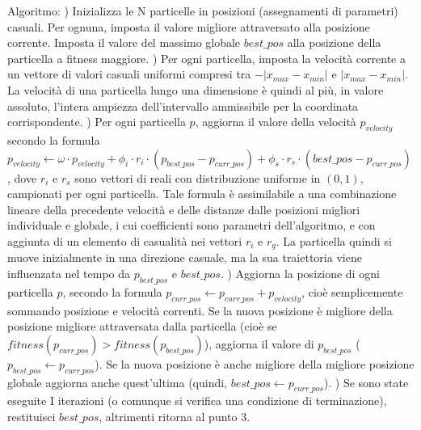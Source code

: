 \documentclass[12pt]{article}
\begin{document}
\newline
Algoritmo: \newline
\tab {}) Inizializza le N particelle in posizioni (assegnamenti di parametri) casuali. Per ognuna, imposta il valore migliore attraversato alla posizione corrente. Imposta il valore del massimo globale $best\_pos$ alla posizione della particella a fitness maggiore. \newline
\tab {}) Per ogni particella, imposta la velocità corrente a un vettore di valori casuali uniformi compresi tra $-|x_{max} - x_{min}|$ e $|x_{max} - x_{min}|$. La velocità di una particella lungo una dimensione è quindi al più, in valore assoluto, l'intera ampiezza dell'intervallo ammissibile per la coordinata corrispondente. \newline
\tab {}) Per ogni particella $p$, aggiorna il valore della velocità $p_{velocity}$ secondo la formula \newline $p_{velocity}  \leftarrow \omega \cdot p_{velocity} + \phi_i \cdot r_i \cdot \left( p_{best\_pos} - p_{curr\_pos} \right) + \phi_s \cdot r_s \cdot \left( best\_pos - p_{curr\_pos} \right) $,\newline
dove $r_i $ e $r_s$ sono vettori di reali con distribuzione uniforme in $ \left( 0, 1 \right) $, campionati per ogni particella. Tale formula è assimilabile a una combinazione lineare della precedente velocità e delle distanze dalle posizioni migliori individuale e globale, i cui coefficienti sono parametri dell'algoritmo, e con aggiunta di un elemento di casualità nei vettori $r_i$ e $r_g$. La particella quindi si muove inizialmente in una direzione casuale, ma la sua traiettoria viene influenzata nel tempo da $p_{best\_pos}$ e $best\_pos$. \newline
\tab {}) Aggiorna la posizione di ogni particella $p$, secondo la formula \newline $p_{curr\_pos} \leftarrow p_{curr\_pos} + p_{velocity}$, cioè semplicemente sommando posizione e velocità correnti. Se la nuova posizione è migliore della posizione migliore attraversata dalla particella (cioè se $fitness(p_{curr\_pos}) >  fitness(p_{best\_pos})$), aggiorna il valore di $p_{best\_pos}$ ($p_{best\_pos} \leftarrow p_{curr\_pos}$). Se la nuova posizione è anche migliore della migliore posizione globale aggiorna anche quest'ultima (quindi, $best\_pos \leftarrow p_{curr\_pos}$). \newline
\tab {}) Se sono state eseguite I iterazioni (o comunque si verifica una condizione di terminazione), restituisci $best\_pos$, altrimenti ritorna al punto 3. \newline 
\newline
\end{document}
